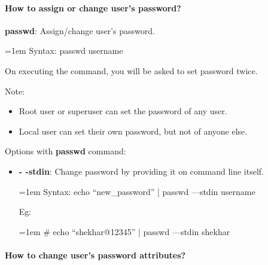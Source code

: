 \begin{flushleft}
	\bigskip
	\bigskip
	
	\newpage
	
	\paragraph{How to assign or change user’s password?}
	
	\bigskip
	\textbf{passwd}: Assign/change user's password.
	
	\begin{tcolorbox}[breakable,notitle,boxrule=0pt,colback=pink,colframe=pink]
		\color{black}
		\font=1em
		Syntax: passwd username
		\font=4pt
	\end{tcolorbox}
	On executing the command, you will be asked to set password twice.
	
	\begin{tcolorbox}[breakable,notitle,boxrule=0pt,colback=yellow,colframe=yellow]
		\color{black}
		Note: 
		\begin{itemize}
			\item Root user or superuser can set the password of any user.
			\item Local user can set their own password, but not of anyone else.
		\end{itemize}

	\end{tcolorbox}
	
	Options with \textbf{passwd} command:
	
	\begin{itemize}
		\item \textbf{- -stdin}: Change password by providing it on command line itself.
		\begin{tcolorbox}[breakable,notitle,boxrule=0pt,colback=pink,colframe=pink]
			\color{black}
			\font=1em
			Syntax: echo “new\_password” | passwd ---stdin username
			\font=4pt
		\end{tcolorbox}
		Eg:
		\bigskip
		\begin{tcolorbox}[breakable,notitle,boxrule=-0pt,colback=black,colframe=black]
			\color{green}
			\font=1em
			\# echo “shekhar@12345” | passwd ---stdin shekhar
			\font=4pt
		\end{tcolorbox}
	\end{itemize}
\newpage

\newpage
\paragraph{How to change user’s password attributes?}


\end{flushleft}
